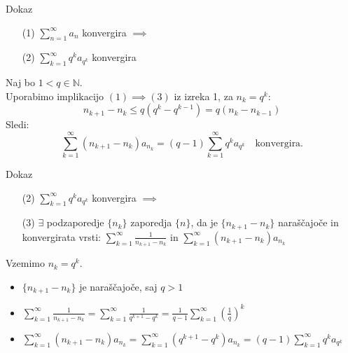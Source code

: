 \documentclass{beamer}
\begin{document}
\begin{frame}{Dokaz}
    \begin{block}{}
        \begin{enumerate}   
            \item[(1)] $\sum_{n = 1}^{\infty}{a_n}$ konvergira $\implies$
            \item[(2)] $\sum_{k = 1}^{\infty}{q^ka_{q^k}}$ konvergira
        \end{enumerate}
    \end{block}     
    
    Naj bo $ 1 < q \in {\mathbb{N}}$.\\
    Uporabimo implikacijo $(1) \implies (3)$
    \pause
    iz izreka 1, za $n_k = q^k$:\\
    \[
        n_{k+1} - n_k \leq q(q^k - q^{k-1}) = q(n_{k} - n_{k - 1})
    \]
    \pause
    Sledi:
    \[
        \sum_{k = 1}^{\infty}{(n_{k+1} - n_k)a_{n_k}} = (q-1)\sum_{k = 1}^{\infty}{q^ka_{q^k}} 
        \quad \text{konvergira.}
    \]    
\end{frame}
\begin{frame}{Dokaz}
    \begin{block}{}
        \begin{enumerate} 
            \item[(2)] $\sum_{k = 1}^{\infty}{q^ka_{q^k}}$ konvergira $\implies$
            \item[(3)] $\exists$ podzaporedje $\{n_k\}$ zaporedja $\{n\}$, da je $\{n_{k+1} - n_k\}$ 
            naraščajoče in konvergirata vrsti:
            $\sum_{k = 1}^{\infty}{\frac{1}{n_{k+1} - n_k}}$ in 
            $\sum_{k = 1}^{\infty}{(n_{k+1} - n_k)a_{n_k}}$
        \end{enumerate}
    \end{block}     
    
    Vzemimo ${n_k} = q^k$.
    \pause 
    \begin{itemize}
        \item $\{n_{k+1} - n_k\}$ je naraščajoče, saj $ q > 1$
        \pause
        \item 
        $\sum_{k = 1}^{\infty}{\frac{1}{n_{k+1} - n_k}} = 
        \sum_{k = 1}^{\infty}{\frac{1}{q^{k + 1} - q^k}} =
        \frac{1}{q - 1}\sum_{k = 1}^{\infty}{(\frac{1}{q})^k}$
        \pause
        \item 
        $\sum_{k = 1}^{\infty}{(n_{k+1} - n_k)a_{n_k}} =
        \sum_{k = 1}^{\infty}{(q^{k + 1} - q^k)}a_{n_k} =
        (q - 1)\sum_{k = 1}^{\infty}{q^ka_{q^k}}$        
    \end{itemize}
    
\end{frame}
\end{document}
